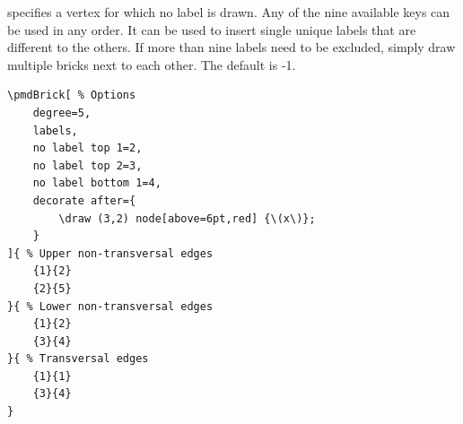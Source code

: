 \documentclass{ltxdoc}
\begin{document}
\DescribeMacro{ \vdots}
\DescribeMacro{ \vdots}
specifies a vertex for which no label is drawn. Any of the nine available keys can be used in any order. It can be used to insert single unique labels that are different to the others. If more than nine labels need to be excluded, simply draw multiple bricks next to each other. The default is -1.
\begin{center}
    \begin{minipage}{\dimexpr0.85\textwidth-2\fboxrule-2\fboxsep\relax}
        \begin{minipage}[c]{0.4\linewidth}
\begin{verbatim}
\pmdBrick[ % Options
    degree=5,
    labels,
    no label top 1=2,
    no label top 2=3,
    no label bottom 1=4,
    decorate after={
        \draw (3,2) node[above=6pt,red] {\(x\)};
    }
]{ % Upper non-transversal edges
    {1}{2}
    {2}{5}
}{ % Lower non-transversal edges
    {1}{2}
    {3}{4}
}{ % Transversal edges
    {1}{1}
    {3}{4}
}
\end{verbatim}
        \end{minipage}
        \hfill
        \begin{minipage}[c]{0.4\linewidth}
        \end{minipage}
    \end{minipage}%
\end{center}
\begin{center}
\end{center}
\end{document}
